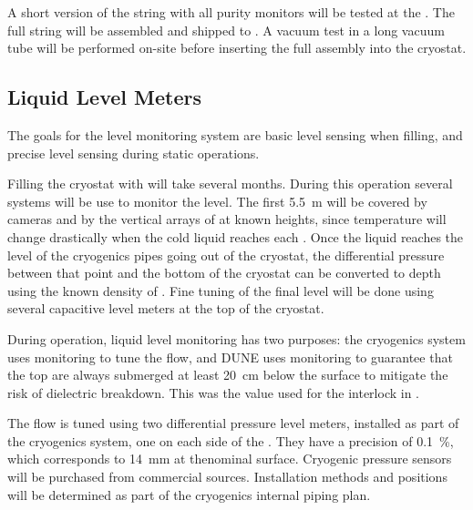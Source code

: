 A short version of the %
string
with all purity monitors will be tested at the .
The full string will be assembled and shipped to . 
 A vacuum test in a long vacuum tube will be performed on-site before inserting the full assembly into the  cryostat. 



\subsection{Liquid Level Meters}

The goals for the  level monitoring system are basic level sensing when filling, and precise level sensing during static operations. 

Filling the cryostat with  will take several months. During this operation several systems will be use to monitor the  level. 
The first \SI{5.5}{m} will be covered by cameras and by the vertical arrays of  at known heights, since temperature will change drastically 
when the cold liquid reaches each . Once the liquid reaches the level of the cryogenics pipes going out of the cryostat, 
the differential pressure between that point and the bottom of the cryostat
can be converted to depth using
the known density of .   Fine tuning of the final  level will be done using several capacitive level meters at the top of the cryostat. 

During operation, liquid level monitoring has two purposes:
the  cryogenics system uses monitoring to tune the  flow, and 
DUNE uses monitoring to guarantee that the top  are always
submerged 
at least \SI{20}{cm} below the  surface to mitigate the risk of dielectric breakdown. This was the value used for the  interlock in . 

The  flow is tuned using two differential pressure level meters, installed as part of the cryogenics system, one on each side of the .  They have a precision of \SI{0.1}{\%}, which corresponds to \SI{14}{mm} at thenominal  surface. Cryogenic pressure sensors will be purchased from commercial sources. Installation methods and positions will be determined as part of the
cryogenics internal piping plan.  

